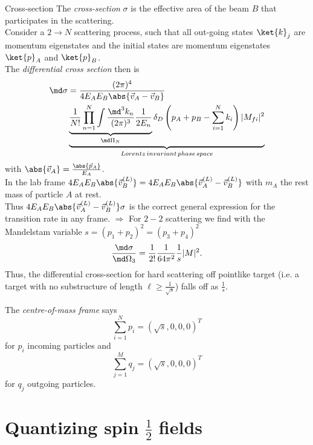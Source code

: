 \begin{mybox}{Cross-section}
	The \emph{cross-section} $\sigma$ is the effective area of the beam $B$ that participates in the scattering.\\
	Consider a $2 \rightarrow N$ scattering process, such that all out-going states $\ket{k}_j$ are momentum eigenstates and the initial states are momentum eigenstates $\ket{p}_A$ and $\ket{p}_B$.\\
	The \emph{differential cross section} then is
	\begin{align}
				\md \sigma &= \frac{(2 \pi)^4}{4 E_A E_B \abs{\vec{v}_A-\vec{v}_B}} \\\
				&\underbrace{\underbrace{ \frac{1}{N!} \prod_{n=1}^{N} \int \frac{\md^3 k_n}{(2 \pi)^3}\frac{1}{2 E_n}  	}_{\md \Pi_N} \delta_D \left(p_A+p_B-\sum_{i=1}^{N} k_i\right) |M_{fi}|^2}_{Lorentz\, invariant\, phase\,space} \nonumber 
	\end{align}
	with $\abs{\vec{v}_A} = \frac{\abs{\vec{p}_A}}{E_A}$.\\
	In the lab frame $4 E_A E_B \abs{\vec{v}^{(L)}_B} = 4 E_A E_B \abs{\vec{v}^{(L)}_A-\vec{v}^{(L)}_B}$ with $m_A$ the rest mass of particle $A$ at rest.\\
	Thus $4 E_A E_B \abs{\vec{v}^{(L)}_A - \vec{v}^{(L)}_B} \sigma$ is the correct general expression for the transition rate in any frame.
	$\Rightarrow$ For $2-2$ scattering we find with the Mandelstam variable $s =(p_1+p_2)^2 = (p_3+p_4)^2$ 
	\begin{equation}
			\frac{\md \sigma}{\md \Omega_3} = \frac{1}{2!} \frac{1}{64 \pi^2} \frac{1}{s} |M|^2.
	\end{equation}
	Thus, the differential cross-section for hard scattering off pointlike target (i.e. a target with no substructure of length $\ell \geq \frac{1}{\sqrt{s}}$) falls off as $\frac{1}{s}$.
\end{mybox}
The \emph{centre-of-mass frame} says
\begin{equation}
	\sum_{i=1}^{N} p_i = (\sqrt{s},0,0,0)^T
\end{equation}
for $p_i$ incoming particles and
\begin{equation}
	\sum_{j=1}^{M} q_j = (\sqrt{s},0,0,0)^T
\end{equation}
for $q_j$ outgoing particles.










\newpage

\section{Quantizing spin $\frac{1}{2}$ fields}
